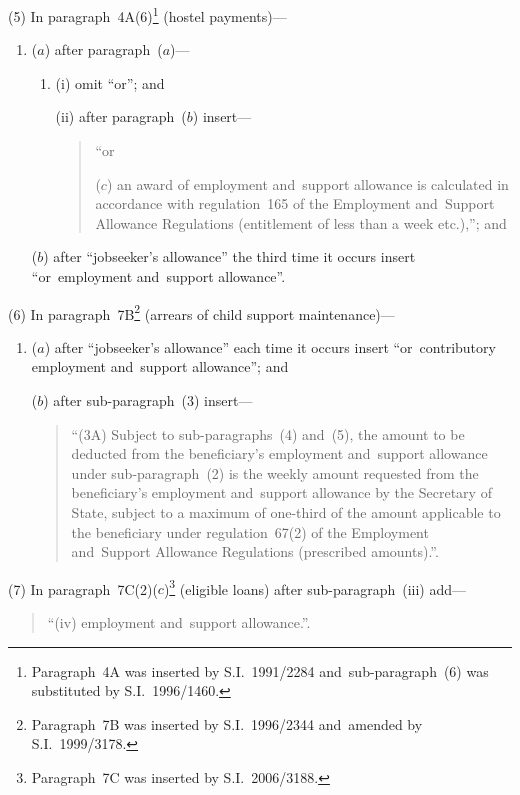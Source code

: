 \documentclass[12pt,a4paper]{article}
\begin{document}
(5) In paragraph~4A(6)\footnote{Paragraph~4A was inserted by S.I.~1991/2284 and~sub-paragraph~(6) was substituted by S.I.~1996/1460.} (hostel payments)—
\begin{enumerate}\item[]
($a$) after paragraph~($a$)—
\begin{enumerate}\item[]
(i) omit “or”; and

(ii) after paragraph~($b$)  insert—
\begin{quotation}
“or

($c$) an award of employment and~support allowance is calculated in accordance with regulation~165 of the Employment and~Support Allowance Regulations (entitlement of less than a week etc.),”; and
\end{quotation}
\end{enumerate}

($b$) after “jobseeker’s allowance” the third time it occurs insert “or~employment and~support allowance”.
\end{enumerate}

(6) In paragraph~7B\footnote{Paragraph~7B was inserted by S.I.~1996/2344 and~amended by S.I.~1999/3178.} (arrears of child support maintenance)—
\begin{enumerate}\item[]
($a$) after “jobseeker’s allowance” each time it occurs insert “or~contributory employment and~support allowance”; and

($b$) after sub-paragraph~(3) insert—
\begin{quotation}
“(3A) Subject to sub-paragraphs~(4) and~(5), the amount to be deducted from the beneficiary’s employment and~support allowance under sub-paragraph~(2) is the weekly amount requested from the beneficiary’s employment and~support allowance by the Secretary of State, subject to a maximum of one-third of the amount applicable to the beneficiary under regulation~67(2) of the Employment and~Support Allowance Regulations (prescribed amounts).”.
\end{quotation}
\end{enumerate}

(7) In paragraph~7C(2)($c$)\footnote{Paragraph~7C was inserted by S.I.~2006/3188.} (eligible loans) after sub-paragraph~(iii)  add—
\begin{quotation}
“(iv) employment and~support allowance.”.
\end{quotation}
\end{document}
